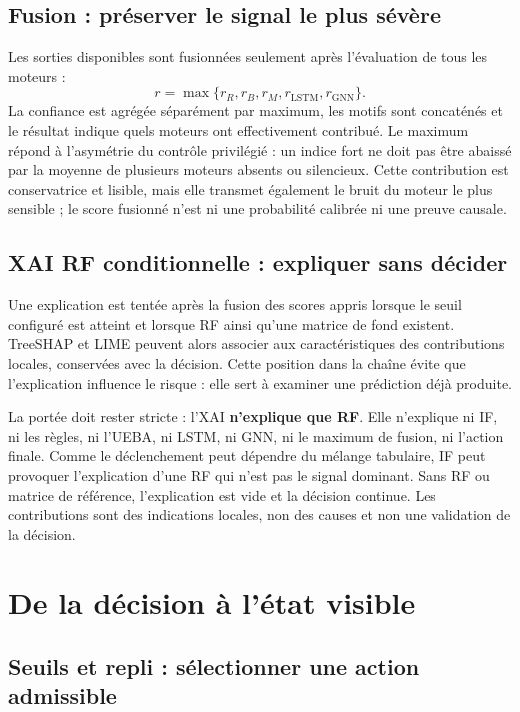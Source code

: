\documentclass[11pt,a4paper,oneside]{report}
\theoremstyle{definition}
\theoremstyle{plain}
\begin{document}
\subsection{Fusion : préserver le signal le plus sévère}

Les sorties disponibles sont fusionnées seulement après l'évaluation de tous
les moteurs :
\[
 r=\max\{r_R,r_B,r_M,r_{\mathrm{LSTM}},r_{\mathrm{GNN}}\}.
\]
La confiance est agrégée séparément par maximum, les motifs sont concaténés et
le résultat indique quels moteurs ont effectivement contribué. Le maximum
répond à l'asymétrie du contrôle privilégié : un indice fort ne doit pas être
abaissé par la moyenne de plusieurs moteurs absents ou silencieux. Cette
contribution est conservatrice et lisible, mais elle transmet également le
bruit du moteur le plus sensible ; le score fusionné n'est ni une probabilité
calibrée ni une preuve causale.

\subsection{XAI RF conditionnelle : expliquer sans décider}

Une explication est tentée après la fusion des scores appris lorsque le seuil
configuré est atteint et lorsque RF ainsi qu'une matrice de fond existent.
TreeSHAP et LIME peuvent alors associer aux caractéristiques des contributions
locales, conservées avec la décision. Cette position dans la chaîne évite que
l'explication influence le risque : elle sert à examiner une prédiction déjà
produite.

La portée doit rester stricte : l'XAI \textbf{n'explique que RF}. Elle
n'explique ni IF, ni les règles, ni l'UEBA, ni LSTM, ni GNN, ni le maximum de
fusion, ni l'action finale. Comme le déclenchement peut dépendre du mélange
tabulaire, IF peut provoquer l'explication d'une RF qui n'est pas le signal
dominant. Sans RF ou matrice de référence, l'explication est vide et la
décision continue. Les contributions sont des indications locales, non des
causes et non une validation de la décision.

\section{De la décision à l'état visible}

\subsection{Seuils et repli : sélectionner une action admissible}
\end{document}
